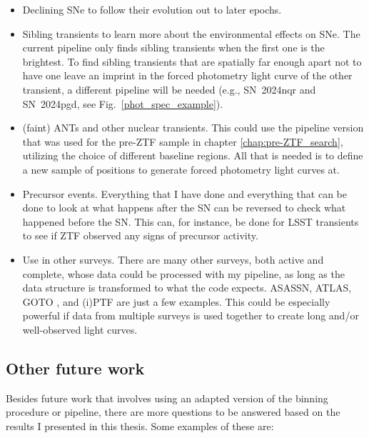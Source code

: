 \documentclass[a4paper,oneside,12pt, class=Latex/Classes/PhDthesisPSnPDF, crop=false]{standalone}
\begin{document}
\begin{itemize}
	\item Declining SNe to follow their evolution out to later epochs.
	\item Sibling transients to learn more about the environmental effects on SNe. The current pipeline only finds sibling transients when the first one is the brightest. To find sibling transients that are spatially far enough apart not to have one leave an imprint in the forced photometry light curve of the other transient, a different pipeline will be needed (e.g., SN~2024nqr and SN~2024pgd, see Fig.~\ref{phot_spec_example}).
	\item (faint) ANTs and other nuclear transients. This could use the pipeline version that was used for the pre-ZTF sample in chapter \ref{chap:pre-ZTF_search}, utilizing the choice of different baseline regions. All that is needed is to define a new sample of positions to generate forced photometry light curves at.
	\item Precursor events. Everything that I have done and everything that can be done to look at what happens after the SN can be reversed to check what happened before the SN. This can, for instance, be done for LSST transients to see if ZTF observed any signs of precursor activity.
	\item Use in other surveys. There are many other surveys, both active and complete, whose data could be processed with my pipeline, as long as the data structure is transformed to what the code expects. ASASSN, ATLAS, GOTO \citep[Gravitational-wave Optical Transient Observer,][]{GOTO_prototype, GOTO}, and (i)PTF are just a few examples. This could be especially powerful if data from multiple surveys is used together to create long and/or well-observed light curves.
\end{itemize}


\subsection{Other future work}
Besides future work that involves using an adapted version of the binning procedure or pipeline, there are more questions to be answered based on the results I presented in this thesis. Some examples of these are:
\end{document}
